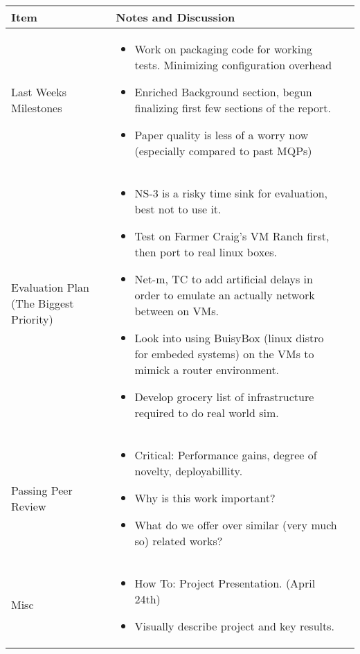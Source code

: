 \documentclass[a4wide,10pt]{extarticle}
\begin{document}
\vspace{0.5cm}
\begin{center}
\begin{tabular}{| m{3.0cm} | m{12.6cm} | m{2cm}|} \hline
\textbf{Item} & \textbf{Notes and Discussion}\\ \hline

Last Weeks Milestones & 
	\begin{itemize}
		\item Work on packaging code for working tests. Minimizing configuration overhead
		\item Enriched Background section, begun finalizing first few sections of the report.
		\item Paper quality is less of a worry now (especially compared to past MQPs)
	\end{itemize} 
\\ \hline

Evaluation Plan (The Biggest Priority) &
	\begin{itemize}
		\item NS-3 is a risky time sink for evaluation, best not to use it.
		\item Test on Farmer Craig's VM Ranch first, then port to real linux boxes.
		\item Net-m, TC to add artificial delays in order to emulate an actually network between on VMs.
		\item Look into using BuisyBox (linux distro for embeded systems) on the VMs to mimick a router environment.
		\item Develop grocery list of infrastructure required to do real world sim.
	\end{itemize}
\\ \hline

Passing Peer Review &
	\begin{itemize}
		\item Critical: Performance gains, degree of novelty, deployabillity.
		\item Why is this work important?
		\item What do we offer over similar (very much so) related works?
	\end{itemize}
\\ \hline

Misc &
	\begin{itemize}
		\item How To: Project Presentation. (April 24th)
		\item Visually describe project and key results.
	\end{itemize}
\\ \hline








\end{tabular}
\end{center}
\end{document}
